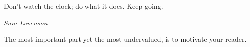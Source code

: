 

\epigraph{Don't watch the clock; do what it does. Keep going.}{\textit{Sam Levenson}}

The most important part yet the most undervalued, is to motivate your reader.
